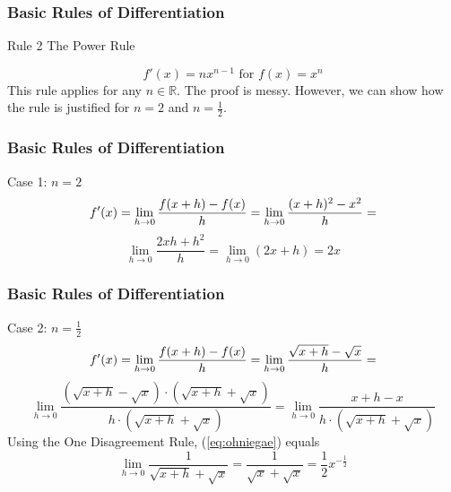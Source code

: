 \documentclass[xcolor=dvipsnames]{beamer}
\begin{document}
\begin{frame}
  \frametitle{Basic Rules of Differentiation}
  \begin{block}{Rule 2}
The Power Rule
  \end{block}
\begin{equation}
  \label{eq:oomaenee}
f'(x)=nx^{n-1}\mbox{ for }f(x)=x^{n}
\end{equation}
This rule applies for any $n\in\mathbb{R}$. The proof is messy.
However, we can show how the rule is justified for $n=2$ and
$n=\frac{1}{2}$.
\end{frame}

\begin{frame}
  \frametitle{Basic Rules of Differentiation}
Case 1: $n=2$
\begin{equation}
  \label{eq:eeyeejeu}
f'(x)=\lim_{h\rightarrow{}0}\frac{f(x+h)-f(x)}{h}=\lim_{h\rightarrow{}0}\frac{(x+h)^{2}-x^{2}}{h}=\notag
\end{equation}
\begin{equation}
  \label{eq:wuuxaise}
\lim_{h\rightarrow{}0}\frac{2xh+h^{2}}{h}=\lim_{h\rightarrow{}0}(2x+h)=2x
\end{equation}
\end{frame}

\begin{frame}
  \frametitle{Basic Rules of Differentiation}
Case 2: $n=\frac{1}{2}$
\begin{equation}
  \label{eq:shoogaka}
f'(x)=\lim_{h\rightarrow{}0}\frac{f(x+h)-f(x)}{h}=\lim_{h\rightarrow{}0}\frac{\sqrt{x+h}-\sqrt{x}}{h}=\notag
\end{equation}
\begin{equation}
  \label{eq:ohniegae}
  \lim_{h\rightarrow{}0}\frac{(\sqrt{x+h}-\sqrt{x})\cdot(\sqrt{x+h}+\sqrt{x})}{h\cdot(\sqrt{x+h}+\sqrt{x})}=\lim_{h\rightarrow{}0}\frac{x+h-x}{h\cdot(\sqrt{x+h}+\sqrt{x})}
\end{equation}
Using the One Disagreement Rule, (\ref{eq:ohniegae}) equals
\begin{equation}
  \label{eq:ohchoacu}
  \lim_{h\rightarrow{}0}\frac{1}{\sqrt{x+h}+\sqrt{x}}=\frac{1}{\sqrt{x}+\sqrt{x}}=\frac{1}{2}x^{-\frac{1}{2}}
\end{equation}
\end{frame}
\end{document}
